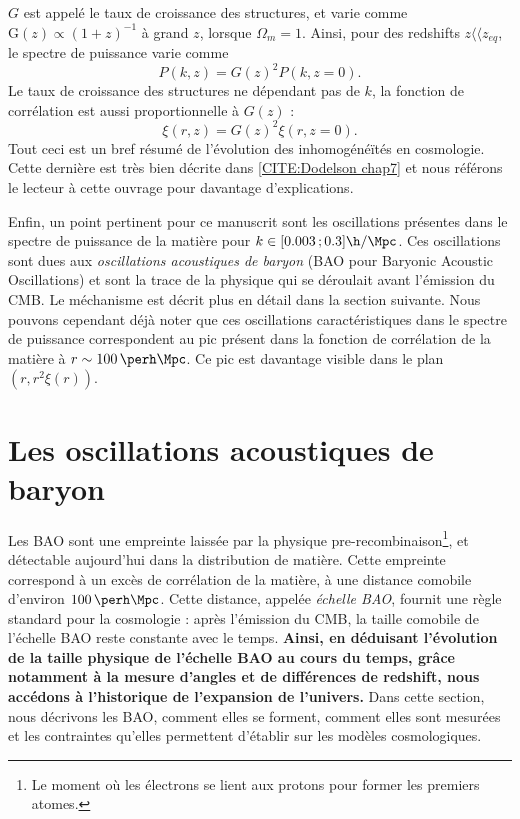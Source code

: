 \documentclass[11pt, twoside, a4paper, openright]{report}
\begin{document}
$G$ est appelé le taux de croissance des structures, et varie comme $\mathrm{G}(z) \propto (1+z)^{-1}$ à grand $z$, lorsque $\Omega_m = 1$. Ainsi, pour des redshifts $z \langle\langle z_{eq}$, le spectre de puissance varie comme
\begin{equation}
  \label{eq:pow_spec_vs_z}
  P(k,z) = G(z)^{2} P(k,z=0) .
\end{equation}
Le taux de croissance des structures ne dépendant pas de $k$, la fonction de corrélation est aussi proportionnelle à $G(z)$ :
\begin{equation}
  \label{eq:cf_vs_z}
  \xi(r, z) = G(z)^{2} \xi(r, z=0).
\end{equation}
Tout ceci est un bref résumé de l'évolution des inhomogénéïtés en cosmologie. Cette dernière est très bien décrite dans \ref{CITE:Dodelson chap7} et nous référons le lecteur à cette ouvrage pour davantage d'explications.


Enfin, un point pertinent pour ce manuscrit sont les oscillations présentes dans le spectre de puissance de la matière pour $k \in [\num{0.003} \,; \num{0.3}] \si{\h\per\Mpc}$. Ces oscillations sont dues aux \emph{oscillations acoustiques de baryon} (BAO pour Baryonic Acoustic Oscillations) et sont la trace de la physique qui se déroulait avant l'émission du CMB. Le méchanisme est décrit plus en détail dans la section suivante. Nous pouvons cependant déjà noter que ces oscillations caractéristiques dans le spectre de puissance correspondent au pic présent dans la fonction de corrélation de la matière à $r \sim \SI{100}{\perh\Mpc}$. Ce pic est davantage visible dans le plan $(r, r^{2} \xi(r))$.

\section{Les oscillations acoustiques de baryon}
Les BAO sont une empreinte laissée par la physique pre-recombinaison\footnote{Le moment où les électrons se lient aux protons pour former les premiers atomes.}, et détectable aujourd'hui dans la distribution de matière. Cette empreinte correspond à un excès de corrélation de la matière, à une distance comobile d'environ $\SI{100}{\perh\Mpc}$. Cette distance, appelée \emph{échelle BAO}, fournit une règle standard pour la cosmologie : après l'émission du CMB, la taille comobile de l'échelle BAO reste constante avec le temps.
\textbf{Ainsi, en déduisant l'évolution de la taille physique de l'échelle BAO au cours du temps, grâce notamment à la mesure d'angles et de différences de redshift, nous accédons à l'historique de l'expansion de l'univers.}
Dans cette section, nous décrivons les BAO, comment elles se forment, comment elles sont mesurées et les contraintes qu'elles permettent d'établir sur les modèles cosmologiques.
\end{document}
